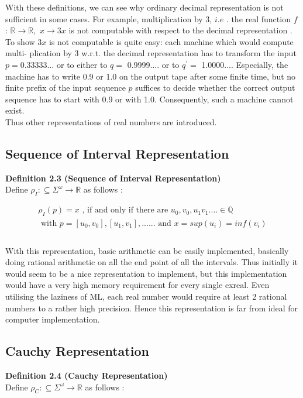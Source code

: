 \documentclass[12pt,twoside,notitlepage]{report}
\begin{document}
With these definitions, we can see why ordinary decimal representation is not sufficient in some cases. For example, multiplication by 3, $i.e$ . the real function $f$ : $\mathbb{R} \rightarrow \mathbb{R},$ $x \rightarrow 3x$ is not computable with respect to the decimal representation \cite{peter}.\\ To show $3x$ is not computable is quite easy: each machine which would compute multi- plication by 3 w.r.t. the decimal representation has to transform the input $p=0.33333\ldots$ or to either to $q=$ 0.9999.... or to $q^{'}=$ 1.0000.... Especially, the machine has to write 0.9 or 1.0 on the output tape after some finite time, but no finite prefix of the input sequence $p$ suffices to decide whether the correct output sequence has to start with 0.9 or with 1.0. Consequently, such a machine cannot exist.\\
Thus other representations of real numbers are introduced.

\subsection {Sequence of Interval Representation}
\textbf{Definition 2.3 (Sequence of Interval Representation)}\cite{weihrauchd}\\
Define $\rho _{\textit{I}}: \subseteq \Sigma^{\omega} \rightarrow \mathbb{R}$ as follows :

\begin{equation}
\begin{split}
\rho _{\textit{I}} (p) = \textit{x} \mbox{ , if and only if there are }u_{0} , v_{0} , u_{1} v_{1} .... \in \mathbb{Q} \\
\mbox{ with } p = [u_{\textit{0}} , v_{\textit{0}}],[u_{\textit{1}} , v_{\textit{1}}], ...... \mbox{ and } \textit{x} = sup(u_{\textit{i}}) = inf(v_{\textit{i}})\\
\end{split}
\end{equation}\\
With this representation, basic arithmetic can be easily implemented, basically doing rational arithmetic on all the end point of all the intervals. Thus initially it would seem to be a nice representation to implement, but this implementation would have a very high memory requirement for every single exreal. Even utilising the laziness of ML, each real number would require at least 2 rational numbers to a rather high precision. Hence this representation is far from ideal for computer implementation.
\subsection {Cauchy Representation}
\textbf{Definition 2.4 (Cauchy Representation)}\cite{weihrauchd}\\
Define $\rho _{\textit{C}}: \subseteq \Sigma^{\omega} \rightarrow \mathbb{R}$ as follows :
\end{document}
